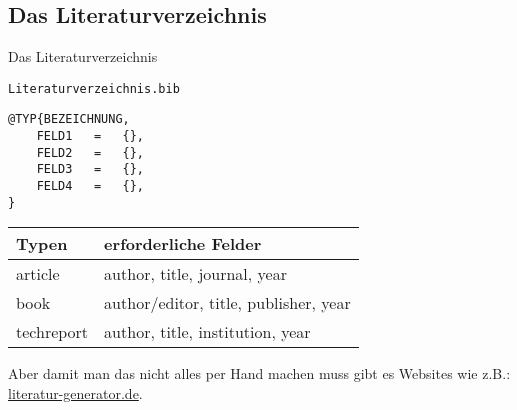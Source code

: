 \subsection{Das Literaturverzeichnis}
\begin{frame}[c]
	\begin{center}
		\large Das Literaturverzeichnis
	\end{center}
\end{frame}
\begin{frame}[fragile]
	\begin{lstlisting}
Literaturverzeichnis.bib
	\end{lstlisting}
	\begin{lstlisting}
@TYP{BEZEICHNUNG,
	FELD1	=	{},
	FELD2	=	{},
	FELD3	=	{},
	FELD4	=	{},
}
	\end{lstlisting}
	\begin{center}
		\begin{tabular}{ll}
			\toprule					
			Typen			&	erforderliche Felder						\\ \midrule
			article			&	author, title, journal, year				\\	
			book			&	author/editor, title, publisher, year		\\
			techreport		&	author, title, institution, year			\\
			\bottomrule
		\end{tabular}
	\end{center}
	\vspace{0.1cm}
\end{frame}
\begin{frame}
	Aber damit man das nicht alles per Hand machen muss gibt es Websites wie z.B.:
	\href{http://literatur-generator.de}{\textrm{literatur-generator.de}}.
\end{frame}
